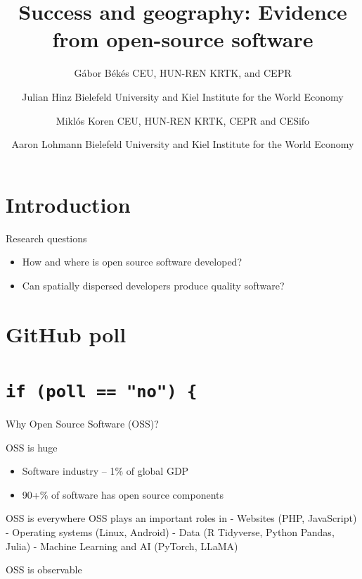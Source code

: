 \documentclass[
  ignorenonframetext,
  aspectratio=169,
]{beamer}
\title{Success and geography: Evidence from open-source software}
\author{Gábor Békés CEU, HUN-REN KRTK, and CEPR \and Julian Hinz
Bielefeld University and Kiel Institute for the World
Economy \and Miklós Koren CEU, HUN-REN KRTK, CEPR and CESifo \and Aaron
Lohmann Bielefeld University and Kiel Institute for the World Economy}
\date{June 19, 2024\footnote<.->{This work was funded by the European
  Union under the Horizon Europe grant 101061123. Views and opinions
  expressed are, however, those of the author(s) only and do not
  necessarily reflect those of the European Union or the European
  Commission. Neither the European Union nor the granting authority can
  be held responsible for them.}}
\providecommand{\tightlist}{%
  \setlength{\itemsep}{0pt}\setlength{\parskip}{0pt}}
\begin{document}
\frame{\titlepage}

\section{Introduction}\label{introduction}

\begin{frame}{Research questions}
\protect\hypertarget{research-questions}{}
\begin{itemize}
\tightlist
\item
  How and where is open source software developed?
\item
  Can spatially dispersed developers produce quality software?
\end{itemize}
\end{frame}

\section{GitHub poll}\label{github-poll}

\section{\texorpdfstring{\texttt{if\ (poll\ ==\ "no")\ \{}}{if (poll == "no") \{}}\label{if-poll-no}

\begin{frame}{Why Open Source Software (OSS)?}
\protect\hypertarget{why-open-source-software-oss}{}
\begin{block}{OSS is huge}
\protect\hypertarget{oss-is-huge}{}
\begin{itemize}
\tightlist
\item
  Software industry -- 1\% of global GDP
\item
  90+\% of software has open source components
\end{itemize}
\end{block}

\begin{block}{OSS is everywhere}
\protect\hypertarget{oss-is-everywhere}{}
OSS plays an important roles in - Websites (PHP, JavaScript) - Operating
systems (Linux, Android) - Data (R Tidyverse, Python Pandas, Julia) -
Machine Learning and AI (PyTorch, LLaMA)
\end{block}

\begin{block}{OSS is observable}
\protect\hypertarget{oss-is-observable}{}
\end{block}
\end{frame}
\end{document}

